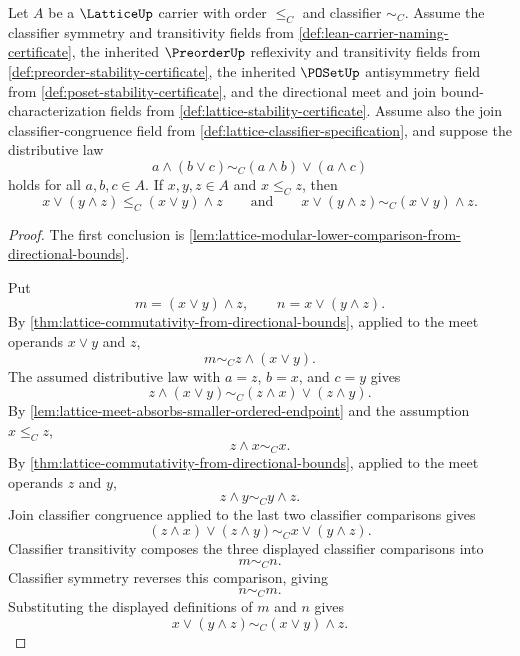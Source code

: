 \begin{theorem}
\label{thm:lattice-distributivity-implies-modular-law}
Let $A$ be a $\LatticeUp$ carrier with order $\le_C$ and classifier $\sim_C$. Assume the classifier symmetry and transitivity fields from \autoref{def:lean-carrier-naming-certificate}, the inherited $\PreorderUp$ reflexivity and transitivity fields from \autoref{def:preorder-stability-certificate}, the inherited $\POSetUp$ antisymmetry field from \autoref{def:poset-stability-certificate}, and the directional meet and join bound-characterization fields from \autoref{def:lattice-stability-certificate}. Assume also the join classifier-congruence field from \autoref{def:lattice-classifier-specification}, and suppose the distributive law
$$
a\wedge(b\vee c)\sim_C (a\wedge b)\vee(a\wedge c)
$$
holds for all $a,b,c\in A$. If $x,y,z\in A$ and $x\le_C z$, then
$$
x\vee(y\wedge z)\le_C (x\vee y)\wedge z
\qquad\text{and}\qquad
x\vee(y\wedge z)\sim_C (x\vee y)\wedge z.
$$
\end{theorem}
\begin{proof}
The first conclusion is \autoref{lem:lattice-modular-lower-comparison-from-directional-bounds}.

Put
$$
m=(x\vee y)\wedge z,
\qquad
n=x\vee(y\wedge z).
$$
By \autoref{thm:lattice-commutativity-from-directional-bounds}, applied to the meet operands $x\vee y$ and $z$,
$$
m\sim_C z\wedge(x\vee y).
$$
The assumed distributive law with $a=z$, $b=x$, and $c=y$ gives
$$
z\wedge(x\vee y)\sim_C (z\wedge x)\vee(z\wedge y).
$$
By \autoref{lem:lattice-meet-absorbs-smaller-ordered-endpoint} and the assumption $x\le_C z$,
$$
z\wedge x\sim_C x.
$$
By \autoref{thm:lattice-commutativity-from-directional-bounds}, applied to the meet operands $z$ and $y$,
$$
z\wedge y\sim_C y\wedge z.
$$
Join classifier congruence applied to the last two classifier comparisons gives
$$
(z\wedge x)\vee(z\wedge y)\sim_C x\vee(y\wedge z).
$$
Classifier transitivity composes the three displayed classifier comparisons into
$$
m\sim_C n.
$$
Classifier symmetry reverses this comparison, giving
$$
n\sim_C m.
$$
Substituting the displayed definitions of $m$ and $n$ gives
$$
x\vee(y\wedge z)\sim_C (x\vee y)\wedge z.
$$
\end{proof}

